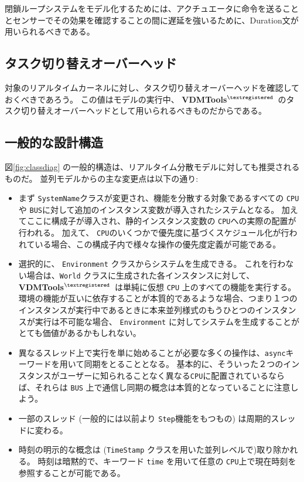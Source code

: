 \documentclass[\pformat,12pt]{jreport}
\newcommand{\vdmtools}{\textbf{VDMTools}$^{\mathbf{{\textregistered}}}$}
\begin{document}
閉鎖ループシステムをモデル化するためには、アクチュエータに命令を送ることとセンサーでその効果を確認することの間に遅延を強いるために、Duration文が用いられるべきである。

\subsection{タスク切り替えオーバーヘッド}

対象のリアルタイムカーネルに対し、タスク切り替えオーバーヘッドを確認しておくべきであろう。
この値はモデルの実行中、 \vdmtools\ のタスク切り替えオーバーヘッドとして用いられるべきものだからである。

\subsection{一般的な設計構造}\label{sec:designvice}

図\ref{fig:classdiag} の一般的構造は、リアルタイム分散モデルに対しても推奨されるものだ。
並列モデルからの主な変更点は以下の通り:

\begin{itemize}
\item まず \texttt{SystemName}クラスが変更され、機能を分散する対象であるすべての \texttt{CPU}や \texttt{BUS}に対して追加のインスタンス変数が導入されたシステムとなる。
加えてここに構成子が導入され、静的インスタンス変数の \texttt{CPU}への実際の配置が行われる。
加えて、 \texttt{CPU}のいくつかで優先度に基づくスケジュール化が行われている場合、この構成子内で様々な操作の優先度定義が可能である。
\item 選択的に、 \texttt{Environment} クラスからシステムを生成できる。
これを行わない場合は、\texttt{World} クラスに生成された各インスタンスに対して、 \vdmtools\ は単純に仮想 \texttt{CPU} 上のすべての機能を実行する。
環境の機能が互いに依存することが本質的であるような場合、つまり１つのインスタンスが実行中であるときに本来並列様式のもうひとつのインスタンスが実行は不可能な場合、 \texttt{Environment} に対してシステムを生成することがとても価値があるかもしれない。
\item 
異なるスレッド上で実行を単に始めることが必要な多くの操作は、\texttt{async}キーワードを用いて同期をとることとなる。
基本的に、そういった２つのインスタンスがユーザーに知られることなく異なる\texttt{CPU}に配置されているならば、それらは \texttt{BUS} 上で通信し同期の概念は本質的となっていることに注意しよう。
\item 一部のスレッド (一般的には以前より \texttt{Step}機能をもつもの) は周期的スレッドに変わる。
\item 時刻の明示的な概念は (\texttt{TimeStamp} クラスを用いた並列レベルで)取り除かれる。
時刻は暗黙的で、キーワード \texttt{time} を用いて任意の \texttt{CPU}上で現在時刻を参照することが可能である。
\end{itemize}
\end{document}
